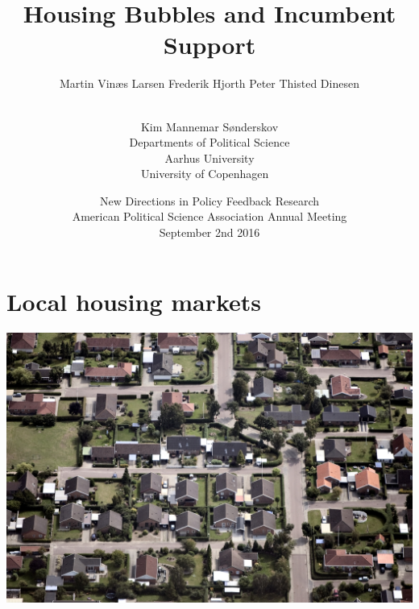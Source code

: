 \documentclass[aspectratio=169]{beamer}
\title[Local Housing Markets]{Housing Bubbles and Incumbent Support}
\author[Larsen et al.]{Martin Vinæs Larsen \qquad Frederik Hjorth \qquad Peter Thisted  Dinesen  \and  \\ Kim Mannemar  Sønderskov \vspace{0.1in}  \\Departments of Political Science \\ Aarhus University \\ University of Copenhagen \ }
\date[Sept. 2nd 2016]{New Directions in Policy Feedback Research \\ American Political Science Association Annual Meeting \\ September 2nd 2016}
\begin{document}
	
	\begin{frame}
		\titlepage
	\end{frame}
	
	\begin{frame}
		\tableofcontents

	\end{frame}
	
	
		\AtBeginSection[]{\begin{frame}
				\tableofcontents[currentsection] 
			\end{frame}}
			

\section{Local housing markets}
\begin{frame}
\includegraphics[width=1\textwidth]{../../figures/villakvarter.jpg}
\end{frame}
\end{document}
